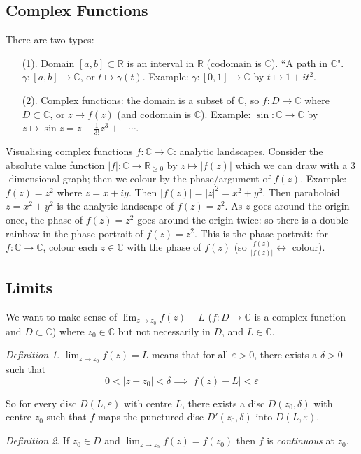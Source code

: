 \documentclass{article}
\theoremstyle{plain}
\theoremstyle{remark}
\newtheorem{definition}{Definition}
\newcommand{\R}{{\mathbb R}}
\newcommand{\C}{{\mathbb C}}
\newcommand{\ep}{{\varepsilon}}
\begin{document}
\subsection{Complex Functions}
There are two types:
\begin{enumerate}
	\item[(1).] Domain $[a,b] \subset \R$ is an interval in $\R$
		(codomain is $\C$).
		``A path in $\C$".
		$\gamma \colon [a,b] \to \C$, or $t \mapsto \gamma(t)$.
		Example: $\gamma \colon [0,1] \to \C$ by $t \mapsto 1 + it^2$.
	\item[(2).] Complex functions: the domain is a subset of $\C$,
		so $f \colon D \to \C$ where $D \subset \C$, or $z \mapsto f(z)$
		(and codomain is $\C$).
		Example: $\sin \colon \C \to \C$ by $z \mapsto \sin{z} = z - \frac{1}{3!}z^3 +- \cdots$.
\end{enumerate}
Visualising complex functions $f \colon \C \to \C$: analytic landscapes.
Consider the absolute value function $|f| \colon \C \to \R_{\geq 0}$
by $z \mapsto |f(z)|$ which we can draw with a $3$-dimensional graph;
then we colour by the phase/argument of $f(z)$.
Example: $f(z) = z^2$ where $z = x + iy$.
Then $|f(z)| = |z|^2 = x^2 + y^2$.
Then paraboloid $z = x^2 + y^2$ is the analytic landscape of $f(z) = z^2$.
As $z$ goes around the origin once, the phase of $f(z) = z^2$ goes around the origin twice:
so there is a double rainbow in the phase portrait of $f(z) = z^2$.
This is the phase portrait:
for $f \colon \C \to \C$, colour each $z \in \C$ with the phase of $f(z)$
(so $\frac{f(z)}{|f(z)|} \leftrightarrow$ colour).

\subsection{Limits}
We want to make sense of $\lim_{z\to z_0}f(z) + L$
($f\colon D \to \C$ is a complex function and $D \subset \C$)
where $z_0 \in \C$ but not necessarily in $D$, and $L \in \C$.
\begin{definition}
	$\lim_{z\to z_0} f(z) = L$ means that for all $\ep > 0$,
	there exists a $\delta > 0$ such that
	\[
		0 < |z - z_0| < \delta \implies |f(z) - L| < \ep
	\]
\end{definition}
So for every disc $D(L,\ep)$ with centre $L$, there exists a disc $D(z_0,\delta)$
with centre $z_0$ such that $f$ maps the punctured disc $D'(z_0,\delta)$ into $D(L,\ep)$.

\begin{definition}
	If $z_0 \in D$ and $\lim_{z\to z_0}f(z) = f(z_0)$ then $f$ is \emph{continuous} at $z_0$.
\end{definition}
\end{document}
